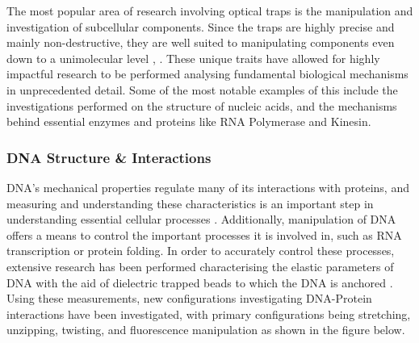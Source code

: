 \documentclass{article}
\begin{document}
The most popular area of research involving optical traps is the manipulation and investigation of subcellular components. Since the traps are highly precise and mainly non-destructive, they are well suited to manipulating components even down to a unimolecular level \cite{Bustamante2021}, \cite{2018_Polimeno}. These unique traits have allowed for highly impactful research to be performed analysing fundamental biological mechanisms in unprecedented detail. Some of the most notable examples of this include the investigations performed on the structure of nucleic acids, and the mechanisms behind essential enzymes and proteins like RNA Polymerase and Kinesin.



\subsubsection*{DNA Structure \& Interactions}

DNA's mechanical properties regulate many of its interactions with proteins, and measuring and understanding these characteristics is an important step in understanding essential cellular processes \cite{Bustamante2021}. Additionally, manipulation of DNA offers a means to control the important processes it is involved in, such as RNA transcription or protein folding. In order to accurately control these processes, extensive research has been performed characterising the elastic parameters of DNA with the aid of dielectric trapped beads to which the DNA is anchored \cite{Lang2003-ll}. Using these measurements, new configurations investigating DNA-Protein interactions have been investigated, with primary configurations being stretching, unzipping, twisting, and fluorescence manipulation as shown in the figure below.
\end{document}
